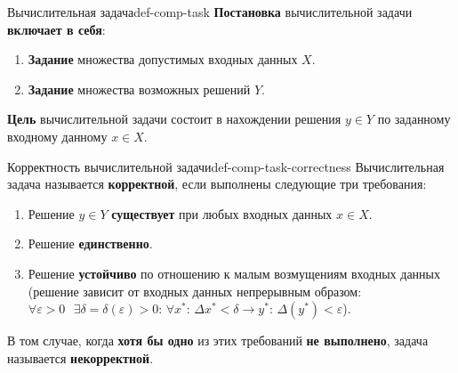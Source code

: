 \documentclass[14pt]{extarticle}
\begin{document}
    \begin{definition}{Вычислительная задача}{def-comp-task}
        \textbf{Постановка} вычислительной задачи \textbf{включает в себя}: 
        \begin{enumerate}
            \item \textbf{Задание} множества допустимых входных данных $X$.
            \item \textbf{Задание} множества возможных решений $Y$. 
        \end{enumerate}

        \vspace{\baselineskip}

        \textbf{Цель} вычислительной задачи состоит в нахождении решения $y \in Y$ по заданному входному данному $x \in X$.
    \end{definition}

    \begin{definition}{Корректность вычислительной задачи}{def-comp-task-correctness}
        Вычислительная задача называется \textbf{корректной}, если выполнены следующие три требования: 
        \begin{enumerate}
            \item Решение $y \in Y$ \textbf{существует} при любых входных данных $x \in X$.
            \item Решение \textbf{единственно}.
            \item Решение \textbf{устойчиво} по отношению к малым возмущениям входных данных (решение зависит от входных данных непрерывным образом: $\forall \varepsilon > 0 \text{ } \exists \delta = \delta(\varepsilon) > 0 \text{: } \forall x^{*} \text{: } \Delta{x^{*}} < \delta \rightarrow y^{*} \text{: } \Delta(y^{*}) < \varepsilon$). 
        \end{enumerate}

        \vspace{\baselineskip}

        В том случае, когда \textbf{хотя бы одно} из этих требований \textbf{не выполнено}, задача называется \textbf{некорректной}.  
    \end{definition}
\end{document}
